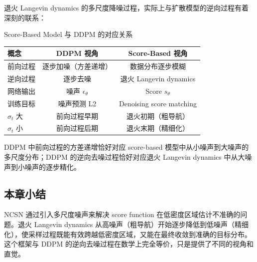 退火 Langevin dynamics 的多尺度降噪过程，实际上与扩散模型的逆向过程有着深刻的联系：

\begin{importantbox}{Score-Based Model 与 DDPM 的对应关系}
\begin{center}
\begin{tabular}{lcc}
\toprule
\textbf{概念} & \textbf{DDPM 视角} & \textbf{Score-Based 视角} \\
\midrule
前向过程 & 逐步加噪（方差递增） & 数据分布逐步模糊 \\
逆向过程 & 逐步去噪 & 退火 Langevin dynamics \\
网络输出 & 噪声 $\epsilon_\theta$ & Score $s_\theta$ \\
训练目标 & 噪声预测 L2 & Denoising score matching \\
$\sigma_t$ 大 & 前向过程早期 & 退火初期（粗导航） \\
$\sigma_t$ 小 & 前向过程后期 & 退火末期（精细化） \\
\bottomrule
\end{tabular}
\end{center}
DDPM 中前向过程的方差递增恰好对应 score-based 模型中从小噪声到大噪声的多尺度分布；DDPM 的逆向去噪过程恰好对应退火 Langevin dynamics 中从大噪声到小噪声的逐步精化。
\end{importantbox}

\subsection{本章小结}

NCSN 通过引入多尺度噪声来解决 score function 在低密度区域估计不准确的问题。退火 Langevin dynamics 从高噪声（粗导航）开始逐步降低到低噪声（精细化），使采样过程既能有效跨越低密度区域，又能在最终收敛到准确的目标分布。这个框架与 DDPM 的逆向去噪过程在数学上完全等价，只是提供了不同的视角和直觉。

